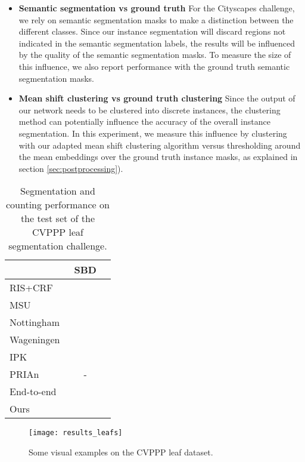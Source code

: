 \documentclass[10pt,twocolumn,letterpaper]{article}
\begin{document}
\begin{itemize}
	\item \textbf{Semantic segmentation vs ground truth} For the Cityscapes challenge, we rely on semantic segmentation masks to make a distinction between the different classes. Since our instance segmentation will discard regions not indicated in the semantic segmentation labels, the results will be influenced by the quality of the semantic segmentation masks. To measure the size of this influence, we also report performance with the ground truth semantic segmentation masks.
    
    \item \textbf{Mean shift clustering vs ground truth clustering} Since the output of our network needs to be clustered into discrete instances, the clustering method can potentially influence the accuracy of the overall instance segmentation. In this experiment, we measure this influence by clustering with our adapted mean shift clustering algorithm versus thresholding around the mean embeddings over the ground truth instance masks, as explained in section \ref{sec:postprocessing}).

\end{itemize}

\begin{table}
	\begin{center}
		\begin{tabular}{l|c|c}
			& SBD &  \\
			\hline
RIS+CRF~\cite{romera2015recurrent} &  &  \\ 
            MSU~\cite{scharr2016leaf} &  &  \\ 
			Nottingham~\cite{scharr2016leaf} &  &  \\ 
			Wageningen~\cite{yin2014multi} &  &  \\
			IPK~\cite{pape20143} &  &  \\
            PRIAn~\cite{giuffrida2016learning} & - &  \\
            End-to-end~\cite{ren2016end} &  &  \\
            \hline
			Ours &  &  \\
		\end{tabular}
	\end{center}
	\caption{Segmentation and counting performance on the test set of the CVPPP leaf segmentation challenge.}
	\label{tab:resultsLeafs}
\end{table}

\begin{figure*}
	\begin{center}
\texttt{[image: results\_leafs]}
	\end{center}
	\caption{Some visual examples on the CVPPP leaf dataset.}
	\label{fig:resultsLeafs}
\end{figure*}
\end{document}
